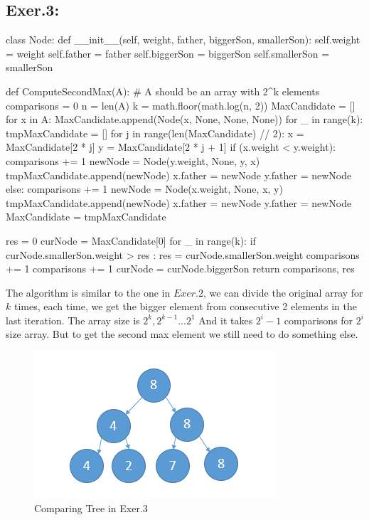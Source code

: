 \documentclass[UTF8]{ctexart}
\begin{document}
\subsection*{Exer.3:}
\begin{python}
class Node:
    def __init__(self, weight, father, biggerSon, smallerSon):
        self.weight = weight
        self.father = father
        self.biggerSon = biggerSon
        self.smallerSon = smallerSon

def ComputeSecondMax(A):
        # A should be an array with 2^k elements
        comparisons = 0
        n = len(A)
        k = math.floor(math.log(n, 2))
        MaxCandidate = []
        for x in A:
            MaxCandidate.append(Node(x, None, None, None))
        for _ in range(k):
            tmpMaxCandidate = []
            for j in range(len(MaxCandidate) // 2):
                x = MaxCandidate[2 * j]
                y = MaxCandidate[2 * j + 1]
                if (x.weight < y.weight):
                    comparisons += 1
                    newNode = Node(y.weight, None, y, x)
                    tmpMaxCandidate.append(newNode)
                    x.father = newNode
                    y.father = newNode
                else:
                    comparisons += 1
                    newNode = Node(x.weight, None, x, y)
                    tmpMaxCandidate.append(newNode)
                    x.father = newNode
                    y.father = newNode
            MaxCandidate = tmpMaxCandidate

        res = 0
        curNode = MaxCandidate[0]
        for _ in range(k):
            if curNode.smallerSon.weight > res :
                res = curNode.smallerSon.weight
                comparisons += 1
            comparisons += 1
            curNode = curNode.biggerSon
        return comparisons, res
\end{python}
    \hspace*{1em} The algorithm is similar to the one in $Exer.2$, we can divide the original array for $k$ times, each time, we 
    get the bigger element from consecutive 2 elements in the last iteration. The array size is $2^k, 2^{k - 1}...2^{1}$
    And it takes $2^i - 1$ comparisons for $2^i$ size array. But to get the second max element we still need to do something else.
    \newpage
    \begin{figure}[h]
        \centering
        \includegraphics[]{2-wayTree.png}
        \caption{Comparing Tree in Exer.3}
    \end{figure}
\end{document}
